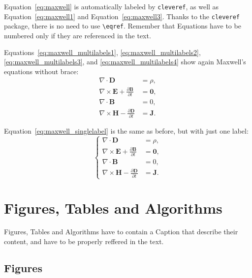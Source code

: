 \documentclass{Configuration_Files/PoliMi3i_thesis}
\begin{document}
Equation~\eqref{eq:maxwell} is automatically labeled by \texttt{cleveref},
as well as Equation~\eqref{eq:maxwell1} and Equation~\eqref{eq:maxwell3}.
Thanks to the \verb|cleveref| package, there is no need to use \verb|\eqref|.
Remember that Equations have to be numbered only if they are referenced in the text.

Equations~\eqref{eq:maxwell_multilabels1}, \eqref{eq:maxwell_multilabels2}, \eqref{eq:maxwell_multilabels3}, and \eqref{eq:maxwell_multilabels4} show again Maxwell's equations without brace:
\begin{align}
	\nabla\cdot \bm{D}                                         & = \rho, \label{eq:maxwell_multilabels1}   \\
	\nabla \times \bm{E} +  \frac{\partial \bm{B}}{\partial t} & = \bm{0}, \label{eq:maxwell_multilabels2} \\
	\nabla\cdot \bm{B}                                         & = 0, \label{eq:maxwell_multilabels3}      \\
	\nabla \times \bm{H} - \frac{\partial \bm{D}}{\partial t}  & = \bm{J} \label{eq:maxwell_multilabels4}.
\end{align}

Equation~\eqref{eq:maxwell_singlelabel} is the same as before,
but with just one label:
\begin{equation}
	\label{eq:maxwell_singlelabel}
	\left\{
	\begin{aligned}
		\nabla\cdot \bm{D}                                         & = \rho,   \\
		\nabla \times \bm{E} +  \frac{\partial \bm{B}}{\partial t} & = \bm{0}, \\
		\nabla\cdot \bm{B}                                         & = 0,      \\
		\nabla \times \bm{H} - \frac{\partial \bm{D}}{\partial t}  & = \bm{J}.
	\end{aligned}
	\right.
\end{equation}

\section{Figures, Tables and Algorithms}
Figures, Tables and Algorithms have to contain a Caption that describe their content, and have to be properly reffered in the text.

\subsection{Figures}
\label{subsec:figures}
\end{document}

